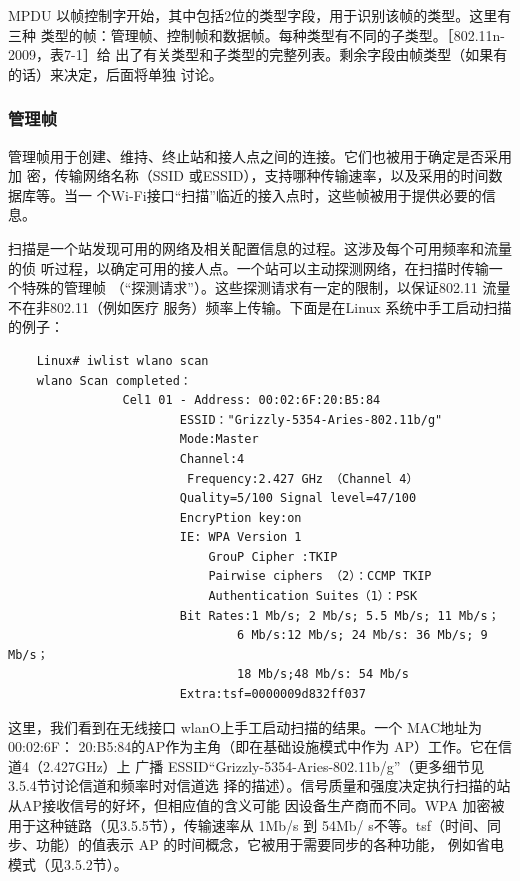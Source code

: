 MPDU 以帧控制字开始，其中包括2位的类型字段，用于识别该帧的类型。这里有三种
类型的帧：管理帧、控制帧和数据帧。每种类型有不同的子类型。［802.11n-2009，表7-1］给
出了有关类型和子类型的完整列表。剩余字段由帧类型（如果有的话）来决定，后面将单独
讨论。

\subsubsection{管理帧}

管理帧用于创建、维持、终止站和接人点之间的连接。它们也被用于确定是否采用加
密，传输网络名称（SSID 或ESSID），支持哪种传输速率，以及采用的时间数据库等。当一
个Wi-Fi接口“扫描”临近的接入点时，这些帧被用于提供必要的信息。

扫描是一个站发现可用的网络及相关配置信息的过程。这涉及每个可用频率和流量的侦
听过程，以确定可用的接人点。一个站可以主动探测网络，在扫描时传输一个特殊的管理帧
（“探测请求”）。这些探测请求有一定的限制，以保证802.11 流量不在非802.11（例如医疗
服务）频率上传输。下面是在Linux 系统中手工启动扫描的例子：

\begin{verbatim}
    Linux# iwlist wlano scan
    wlano Scan completed：
                Cel1 01 - Address: 00:02:6F:20:B5:84
                        ESSID："Grizzly-5354-Aries-802.11b/g"
                        Mode:Master
                        Channel:4
                         Frequency:2.427 GHz （Channel 4）
                        Quality=5/100 Signal level=47/100
                        EncryPtion key:on
                        IE: WPA Version 1
                            GrouP Cipher :TKIP
                            Pairwise ciphers （2）：CCMP TKIP
                            Authentication Suites（1）：PSK
                        Bit Rates:1 Mb/s; 2 Mb/s; 5.5 Mb/s; 11 Mb/s；
                                6 Mb/s:12 Mb/s; 24 Mb/s: 36 Mb/s; 9 Mb/s；
                                18 Mb/s;48 Mb/s: 54 Mb/s
                        Extra:tsf=0000009d832ff037
\end{verbatim}

这里，我们看到在无线接口 wlanO上手工启动扫描的结果。一个 MAC地址为 00:02:6F：
20:B5:84的AP作为主角（即在基础设施模式中作为 AP）工作。它在信道4（2.427GHz）上
广播 ESSID“Grizzly-5354-Aries-802.11b/g”（更多细节见3.5.4节讨论信道和频率时对信道选
择的描述）。信号质量和强度决定执行扫描的站从AP接收信号的好坏，但相应值的含义可能
因设备生产商而不同。WPA 加密被用于这种链路（见3.5.5节），传输速率从 1Mb/s 到 54Mb/
s不等。tsf（时间、同步、功能）的值表示 AP 的时间概念，它被用于需要同步的各种功能，
例如省电模式（见3.5.2节）。

